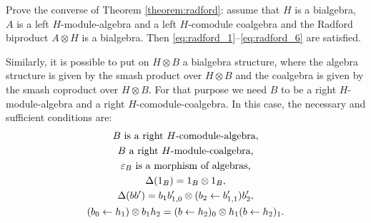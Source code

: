 \begin{exercise}
Prove the converse of Theorem \ref{theorem:radford}: assume that $H$ is a
bialgebra, $A$ is a left $H$-module-algebra and a left $H$-comodule coalgebra
and the Radford biproduct $A\otimes H$ is a bialgebra. Then
\eqref{eq:radford_1}--\eqref{eq:radford_6} are satisfied.
\end{exercise}


\begin{remark}
Similarly, it is possible to put on $H\otimes B$ a bialgebra structure, where
the algebra structure is given by the smash product over $H\otimes B$ and the
coalgebra is given by the smash coproduct over $H\otimes B$. For that purpose
we need $B$ to be a right $H$-module-algebra and a right
$H$-comodule-coalgebra. In this case, the necessary and sufficient conditions
are:
\begin{gather*}
B\text{ is a right \ensuremath{H}-comodule-algebra,}\\
B\text{ a right \ensuremath{H}-module-coalgebra,}\\
\varepsilon_{B}\text{ is a morphism of algebras,}\\
\Delta(1_{B})=1_{B}\otimes1_{B},\\
\Delta(bb')=b_{1}b'_{1,0}\otimes(b_{2}\leftarrow b'_{1,1})b'_{2},\\
(b_{0}\leftarrow h_{1})\otimes b_{1}h_{2}=(b\leftarrow h_{2})_{0}\otimes h_{1}(b\leftarrow h_{2})_{1}.\end{gather*}
\end{remark}

